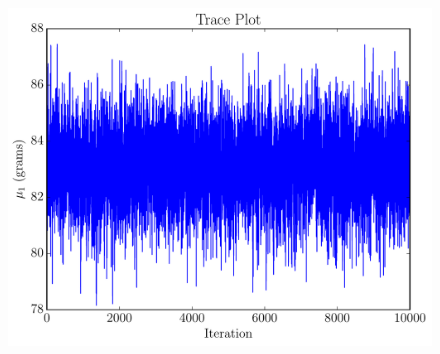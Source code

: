 \begin{figure}[!ht]
\begin{center}
\includegraphics[scale=0.6]{Figures/trace_starlings2.pdf}
\end{center}
\end{figure}

